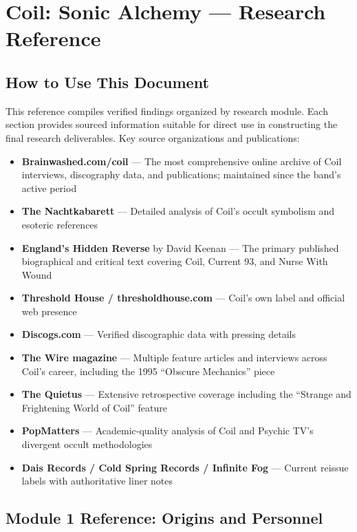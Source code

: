\documentclass[11pt,letterpaper]{article}
\begin{document}
\section{Coil: Sonic Alchemy --- Research Reference}

\subsection{How to Use This Document}

This reference compiles verified findings organized by research module. Each section provides sourced information suitable for direct use in constructing the final research deliverables. Key source organizations and publications:

\begin{itemize}[leftmargin=2em]
\item \textbf{Brainwashed.com/coil} --- The most comprehensive online archive of Coil interviews, discography data, and publications; maintained since the band's active period
\item \textbf{The Nachtkabarett} --- Detailed analysis of Coil's occult symbolism and esoteric references
\item \textbf{England's Hidden Reverse} by David Keenan --- The primary published biographical and critical text covering Coil, Current 93, and Nurse With Wound
\item \textbf{Threshold House / thresholdhouse.com} --- Coil's own label and official web presence
\item \textbf{Discogs.com} --- Verified discographic data with pressing details
\item \textbf{The Wire magazine} --- Multiple feature articles and interviews across Coil's career, including the 1995 ``Obscure Mechanics'' piece
\item \textbf{The Quietus} --- Extensive retrospective coverage including the ``Strange and Frightening World of Coil'' feature
\item \textbf{PopMatters} --- Academic-quality analysis of Coil and Psychic TV's divergent occult methodologies
\item \textbf{Dais Records / Cold Spring Records / Infinite Fog} --- Current reissue labels with authoritative liner notes
\end{itemize}

\subsection{Module 1 Reference: Origins and Personnel}
\end{document}
